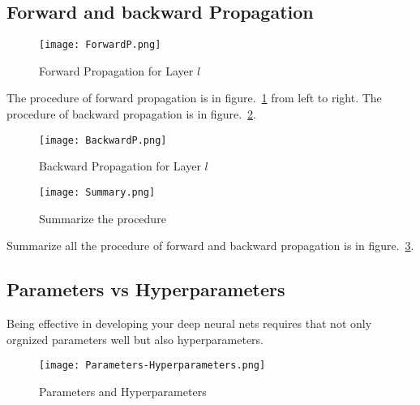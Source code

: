 \documentclass[a4paper]{article}
\begin{document}
\subsection{Forward and backward Propagation}

\begin{figure}[!htp]
\begin{center}
   \texttt{[image: ForwardP.png]}
\end{center}
   \caption{Forward Propagation for Layer $l$~\cite{mooc.com,Coursera.org}}
\label{fig:ForwardP}
\end{figure}
 
The procedure of forward propagation is in figure.~\ref{fig:ForwardP} from left to right. The procedure of backward propagation is in figure.~\ref{fig:BackwardP}.

\begin{figure}[!htp]
\begin{center}
   \texttt{[image: BackwardP.png]}
\end{center}
   \caption{Backward Propagation for Layer $l$~\cite{mooc.com,Coursera.org}}
\label{fig:BackwardP}
\end{figure}

\begin{figure}[!htp]
\begin{center}
   \texttt{[image: Summary.png]}
\end{center}
   \caption{Summarize the procedure~\cite{mooc.com,Coursera.org}}
\label{fig:Summary}
\end{figure}

Summarize all the procedure of forward and backward propagation is in figure.~\ref{fig:Summary}.


\subsection{Parameters vs Hyperparameters}
Being effective in developing your deep neural nets requires that not only orgnized parameters well but also hyperparameters.

\begin{figure}[!htp]
\begin{center}
   \texttt{[image: Parameters-Hyperparameters.png]}
\end{center}
   \caption{Parameters and Hyperparameters~\cite{mooc.com,Coursera.org}}
\label{fig:PH}
\end{figure}
\end{document}

